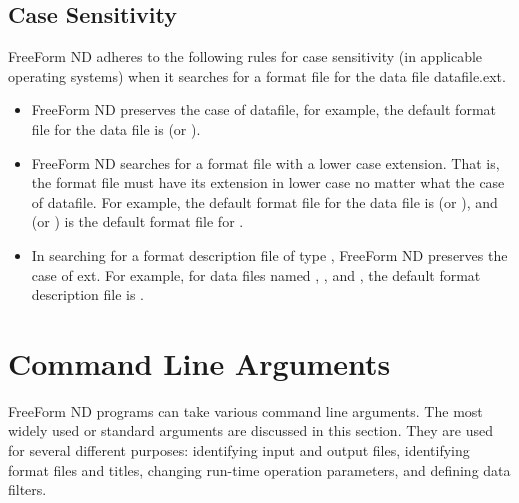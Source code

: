 \subsection{Case Sensitivity}
\label{ff,convs,case}

FreeForm ND adheres to the following rules for case sensitivity (in
applicable operating systems) when it searches for a format file for
the data file datafile.ext.

\begin{itemize}
\item FreeForm ND preserves the case of datafile, for example, the
  default format file for the data file  is  (or
  ).
  
\item FreeForm ND searches for a format file with a lower case
  extension. That is, the format file must have its extension in lower
  case no matter what the case of datafile. For example, the default
  format file for the data file  is  (or
  ), and  (or ) is the default
  format file for .
  
\item In searching for a format description file of type ,
  FreeForm ND preserves the case of ext. For example, for data files
  named , , and , the default format
  description file is .
\end{itemize}

\section{Command Line Arguments}
\label{ff,convs,argument}

FreeForm ND programs can take various command line arguments. The most
widely used or standard arguments are discussed in this section. They
are used for several different purposes: identifying input and output
files, identifying format files and titles, changing run-time
operation parameters, and defining data filters.

